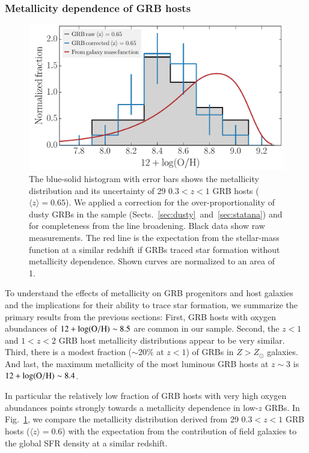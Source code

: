 \documentclass[traditabstract, longauth]{aa}
\newcommand{\oh}{12+\log(\rm{O/H})}
\begin{document}
\subsubsection{Metallicity dependence of GRB hosts}

\begin{figure}
\includegraphics[angle=0, width=0.99\columnwidth]{Figs/MetvsMass.pdf}
\caption{ {The blue-solid histogram with error bars shows the metallicity distribution and its uncertainty of 29 $0.3<z<1$ GRB hosts ($\langle z \rangle = 0.65$). We applied a correction for the over-proportionality of dusty GRBs in the sample (Sects.~\ref{sec:dusty}~and~\ref{sec:statana}) and for completeness from the line broadening. Black data show raw measurements. The red line is the expectation from the stellar-mass function at a similar redshift \citep{2014ApJ...783...85T} if GRBs traced star formation without metallicity dependence. Shown curves are normalized to an area of 1.}}
\label{fig:metvsmass}
\end{figure}

To understand the effects of metallicity on GRB progenitors and host galaxies and the implications for their ability to trace star formation, we summarize the primary results from the previous sections: First, GRB hosts with oxygen abundances of $\oh\sim8.5$ are common in our sample. Second, the $z<1$ and $1<z<2$ GRB host metallicity distributions appear to be very similar. Third, there is a modest fraction ($\sim 20\%$ at $z<1$) of GRBs in $Z > Z_{\odot}$ galaxies. And last, the maximum metallicity of the most luminous GRB hosts at $z\sim3$ is $\oh\sim8.4$.

{In particular the relatively low fraction of GRB hosts with very high oxygen abundances points strongly towards a metallicity dependence in low-$z$ GRBs.}  {In Fig.~\ref{fig:metvsmass}, we compare the metallicity distribution derived from 29 $0.3<z<1$ GRB hosts ($\langle z \rangle = 0.6$) with the expectation from the contribution of field galaxies to the global SFR density at a similar redshift. }
\end{document}
